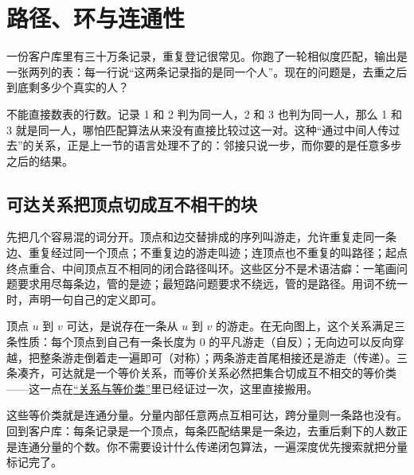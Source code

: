 \section{路径、环与连通性}
\label{sec:04-Discrete-Mathematics/03-Graph-Theory/02}

一份客户库里有三十万条记录，重复登记很常见。你跑了一轮相似度匹配，输出是一张两列的表：每一行说``这两条记录指的是同一个人''。现在的问题是，去重之后到底剩多少个真实的人？

不能直接数表的行数。记录 1 和 2 判为同一人，2 和 3 也判为同一人，那么 1 和 3 就是同一人，哪怕匹配算法从来没有直接比较过这一对。这种``通过中间人传过去''的关系，正是上一节的语言处理不了的：邻接只说一步，而你要的是任意多步之后的结果。

\subsection{可达关系把顶点切成互不相干的块}

先把几个容易混的词分开。顶点和边交替排成的序列叫游走，允许重复走同一条边、重复经过同一个顶点；不重复边的游走叫迹；连顶点也不重复的叫路径；起点终点重合、中间顶点互不相同的闭合路径叫环。这些区分不是术语洁癖：一笔画问题要求用尽每条边，管的是迹；最短路问题要求不绕远，管的是路径。用词不统一时，声明一句自己的定义即可。

顶点 \(u\) 到 \(v\) 可达，是说存在一条从 \(u\) 到 \(v\) 的游走。在无向图上，这个关系满足三条性质：每个顶点到自己有一条长度为 0 的平凡游走（自反）；无向边可以反向穿越，把整条游走倒着走一遍即可（对称）；两条游走首尾相接还是游走（传递）。三条凑齐，可达就是一个等价关系，而等价关系必然把集合切成互不相交的等价类——这一点在\hyperref[sec:01-Mathematical-Language/02-Sets-Relations-Functions/02]{``关系与等价类''}里已经证过一次，这里直接搬用。

这些等价类就是连通分量。分量内部任意两点互相可达，跨分量则一条路也没有。回到客户库：每条记录是一个顶点，每条匹配结果是一条边，去重后剩下的人数正是连通分量的个数。你不需要设计什么传递闭包算法，一遍深度优先搜索就把分量标记完了。


